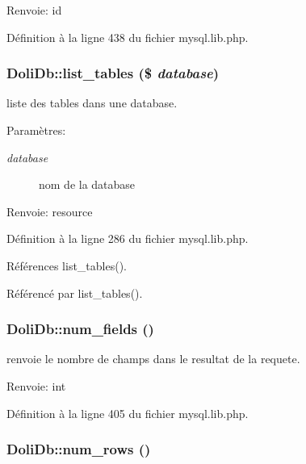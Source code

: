 \begin{Desc}
\item[Renvoie:]id \end{Desc}


D\'{e}finition \`{a} la ligne 438 du fichier mysql.lib.php.\hypertarget{classDoliDb_a11}{
\subsubsection[list\_\-tables]{\setlength{\rightskip}{0pt plus 5cm}Doli\-Db::list\_\-tables (\$ {\em database})}}
\label{classDoliDb_a11}


liste des tables dans une database. 

\begin{Desc}
\item[Param\`{e}tres:]
\begin{description}
\item[{\em database}]nom de la database \end{description}
\end{Desc}
\begin{Desc}
\item[Renvoie:]resource \end{Desc}


D\'{e}finition \`{a} la ligne 286 du fichier mysql.lib.php.

R\'{e}f\'{e}rences list\_\-tables().

R\'{e}f\'{e}renc\'{e} par list\_\-tables().\hypertarget{classDoliDb_a22}{
\subsubsection[num\_\-fields]{\setlength{\rightskip}{0pt plus 5cm}Doli\-Db::num\_\-fields ()}}
\label{classDoliDb_a22}


renvoie le nombre de champs dans le resultat de la requete. 

\begin{Desc}
\item[Renvoie:]int \end{Desc}


D\'{e}finition \`{a} la ligne 405 du fichier mysql.lib.php.\hypertarget{classDoliDb_a21}{
\subsubsection[num\_\-rows]{\setlength{\rightskip}{0pt plus 5cm}Doli\-Db::num\_\-rows ()}}
\label{classDoliDb_a21}


